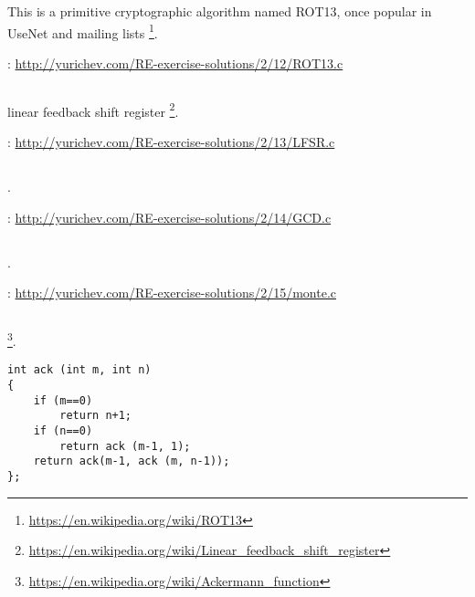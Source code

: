{This is a primitive cryptographic algorithm named ROT13, once popular in UseNet and mailing lists}
\footnote{\url{https://en.wikipedia.org/wiki/ROT13}}.

\Sourcecode: \url{http://yurichev.com/RE-exercise-solutions/2/12/ROT13.c}

\subsection{}

linear feedback shift register
\footnote{\url{https://en.wikipedia.org/wiki/Linear_feedback_shift_register}}.

\Sourcecode: \url{http://yurichev.com/RE-exercise-solutions/2/13/LFSR.c}

\subsection{}

.

\Sourcecode: \url{http://yurichev.com/RE-exercise-solutions/2/14/GCD.c}

\subsection{}

.

\Sourcecode: \url{http://yurichev.com/RE-exercise-solutions/2/15/monte.c}

\subsection{}

\footnote{\url{https://en.wikipedia.org/wiki/Ackermann_function}}.

\begin{lstlisting}
int ack (int m, int n)
{
	if (m==0)
		return n+1;
	if (n==0)
		return ack (m-1, 1);
	return ack(m-1, ack (m, n-1));
};
\end{lstlisting}

